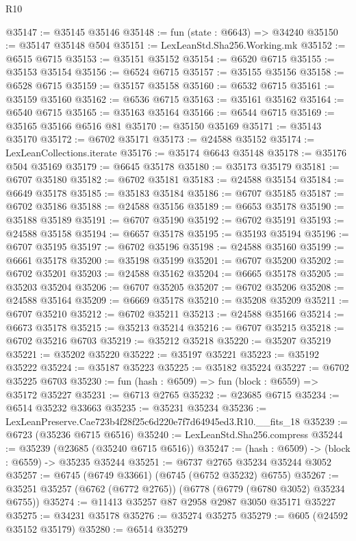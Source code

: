 \begin{lexlean}{R10}
\begin{coremodule}
@35147 := @35145 @35146
@35148 := fun (state : @6643) => @34240
@35150 := @35147 @35148 @504
@35151 := LexLeanStd.Sha256.Working.mk
@35152 := @6515 @6715
@35153 := @35151 @35152
@35154 := @6520 @6715
@35155 := @35153 @35154
@35156 := @6524 @6715
@35157 := @35155 @35156
@35158 := @6528 @6715
@35159 := @35157 @35158
@35160 := @6532 @6715
@35161 := @35159 @35160
@35162 := @6536 @6715
@35163 := @35161 @35162
@35164 := @6540 @6715
@35165 := @35163 @35164
@35166 := @6544 @6715
@35169 := @35165 @35166 @6516 @81
@35170 := @35150 @35169
@35171 := @35143 @35170
@35172 := @6702 @35171
@35173 := @24588 @35152
@35174 := LexLeanCollections.iterate
@35176 := @35174 @6643 @35148
@35178 := @35176 @504 @35169
@35179 := @6645 @35178
@35180 := @35173 @35179
@35181 := @6707 @35180
@35182 := @6702 @35181
@35183 := @24588 @35154
@35184 := @6649 @35178
@35185 := @35183 @35184
@35186 := @6707 @35185
@35187 := @6702 @35186
@35188 := @24588 @35156
@35189 := @6653 @35178
@35190 := @35188 @35189
@35191 := @6707 @35190
@35192 := @6702 @35191
@35193 := @24588 @35158
@35194 := @6657 @35178
@35195 := @35193 @35194
@35196 := @6707 @35195
@35197 := @6702 @35196
@35198 := @24588 @35160
@35199 := @6661 @35178
@35200 := @35198 @35199
@35201 := @6707 @35200
@35202 := @6702 @35201
@35203 := @24588 @35162
@35204 := @6665 @35178
@35205 := @35203 @35204
@35206 := @6707 @35205
@35207 := @6702 @35206
@35208 := @24588 @35164
@35209 := @6669 @35178
@35210 := @35208 @35209
@35211 := @6707 @35210
@35212 := @6702 @35211
@35213 := @24588 @35166
@35214 := @6673 @35178
@35215 := @35213 @35214
@35216 := @6707 @35215
@35218 := @6702 @35216 @6703
@35219 := @35212 @35218
@35220 := @35207 @35219
@35221 := @35202 @35220
@35222 := @35197 @35221
@35223 := @35192 @35222
@35224 := @35187 @35223
@35225 := @35182 @35224
@35227 := @6702 @35225 @6703
@35230 := fun (hash : @6509) => fun (block : @6559) => @35172 @35227
@35231 := @6713 @2765
@35232 := @23685 @6715
@35234 := @6514 @35232 @33663
@35235 := @35231 @35234
@35236 := LexLeanPreserve.Cae723b4f28f25c6d220e7f7d64945ed3.R10.__fits_18
@35239 := @6723 (@35236 @6715 @6516)
@35240 := LexLeanStd.Sha256.compress
@35244 := @35239 (@23685 (@35240 @6715 @6516))
@35247 := (hash : @6509) -> (block : @6559) -> @35235 @35244
@35251 := @6737 @2765 @35234 @35244 @3052
@35257 := @6745 (@6749 @33661) (@6745 (@6752 @35232) @6755)
@35267 := @35251 @35257 (@6762 (@6772 @2765)) (@6778 (@6779 (@6780 @3052) @35234 @6755))
@35274 := @11413 @35257 @87 @2958 @2987 @3050 @35171 @35227
@35275 := @34231 @35178
@35276 := @35274 @35275
@35279 := @605 (@24592 @35152 @35179)
@35280 := @6514 @35279

\end{coremodule}
\end{lexlean}
